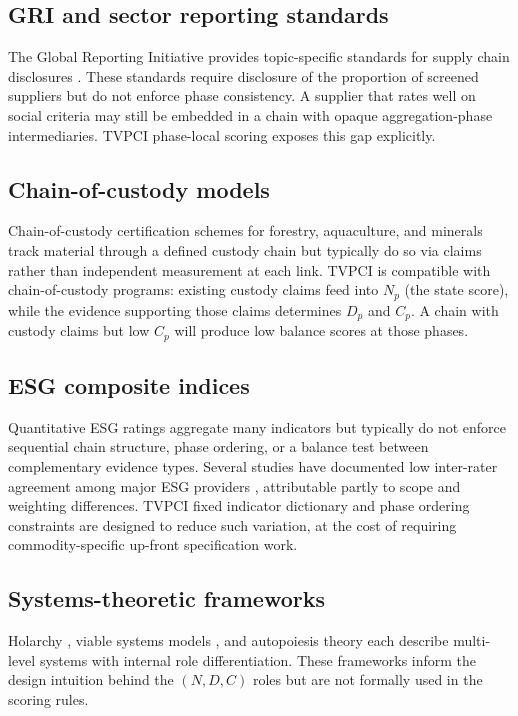\documentclass[12pt]{article}
\theoremstyle{remark}
\begin{document}
\subsection{GRI and sector reporting standards}

The Global Reporting Initiative provides topic-specific standards for supply chain
disclosures \cite{GRI308,GRI414}.  These standards require disclosure of the proportion of
screened suppliers but do not enforce phase consistency.  A supplier that rates well on
social criteria may still be embedded in a chain with opaque aggregation-phase
intermediaries.  TVPCI phase-local scoring exposes this gap explicitly.

\subsection{Chain-of-custody models}

Chain-of-custody certification schemes for forestry, aquaculture, and minerals track
material through a defined custody chain but typically do so via claims rather than
independent measurement at each link.  TVPCI is compatible with chain-of-custody
programs: existing custody claims feed into $N_p$ (the state score), while the evidence
supporting those claims determines $D_p$ and $C_p$.  A chain with custody claims but low
$C_p$ will produce low balance scores at those phases.

\subsection{ESG composite indices}

Quantitative ESG ratings aggregate many indicators but typically do not enforce sequential
chain structure, phase ordering, or a balance test between complementary evidence types.
Several studies have documented low inter-rater agreement among major ESG providers
\cite{Berg2022}, attributable partly to scope and weighting differences.  TVPCI fixed
indicator dictionary and phase ordering constraints are designed to reduce such variation,
at the cost of requiring commodity-specific up-front specification work.

\subsection{Systems-theoretic frameworks}

Holarchy \cite{Koestler1967}, viable systems models \cite{Beer1972}, and autopoiesis
theory each describe multi-level systems with internal role differentiation.  These
frameworks inform the design intuition behind the $(N, D, C)$ roles but are not formally
used in the scoring rules.
\end{document}
